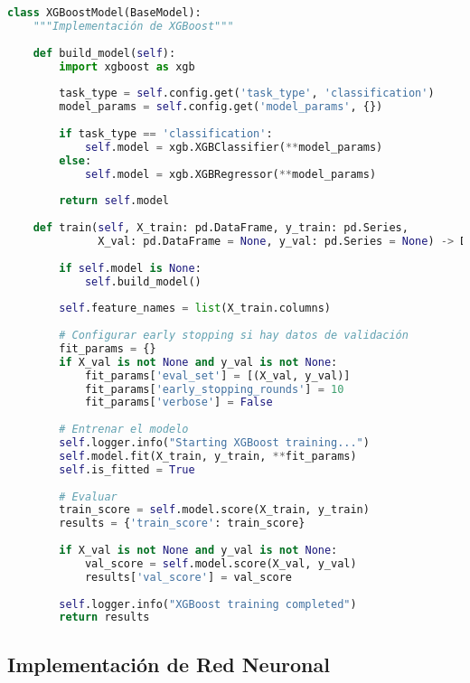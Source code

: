 \begin{lstlisting}[language=Python, caption=Arquitectura base para modelos de ML]
class XGBoostModel(BaseModel):
    """Implementación de XGBoost"""
    
    def build_model(self):
        import xgboost as xgb
        
        task_type = self.config.get('task_type', 'classification')
        model_params = self.config.get('model_params', {})
        
        if task_type == 'classification':
            self.model = xgb.XGBClassifier(**model_params)
        else:
            self.model = xgb.XGBRegressor(**model_params)
        
        return self.model
    
    def train(self, X_train: pd.DataFrame, y_train: pd.Series, 
              X_val: pd.DataFrame = None, y_val: pd.Series = None) -> Dict[str, Any]:
        
        if self.model is None:
            self.build_model()
        
        self.feature_names = list(X_train.columns)
        
        # Configurar early stopping si hay datos de validación
        fit_params = {}
        if X_val is not None and y_val is not None:
            fit_params['eval_set'] = [(X_val, y_val)]
            fit_params['early_stopping_rounds'] = 10
            fit_params['verbose'] = False
        
        # Entrenar el modelo
        self.logger.info("Starting XGBoost training...")
        self.model.fit(X_train, y_train, **fit_params)
        self.is_fitted = True
        
        # Evaluar
        train_score = self.model.score(X_train, y_train)
        results = {'train_score': train_score}
        
        if X_val is not None and y_val is not None:
            val_score = self.model.score(X_val, y_val)
            results['val_score'] = val_score
        
        self.logger.info("XGBoost training completed")
        return results
\end{lstlisting}

\subsection{Implementación de Red Neuronal}


